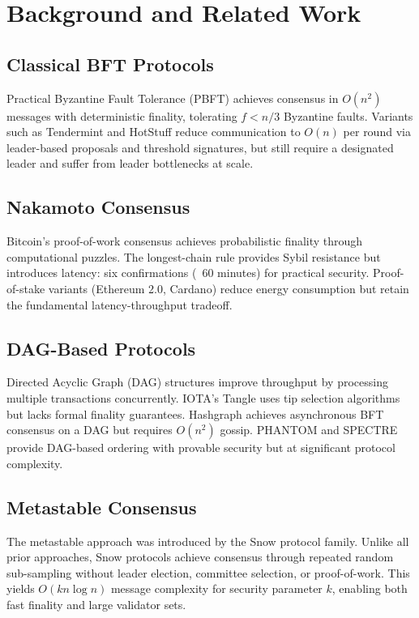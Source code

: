 \section{Background and Related Work}
\label{sec:background}

\subsection{Classical BFT Protocols}

Practical Byzantine Fault Tolerance (PBFT) \citep{castro1999practical} achieves consensus in $O(n^2)$ messages with deterministic finality, tolerating $f < n/3$ Byzantine faults. Variants such as Tendermint \citep{buchman2016tendermint} and HotStuff \citep{yin2019hotstuff} reduce communication to $O(n)$ per round via leader-based proposals and threshold signatures, but still require a designated leader and suffer from leader bottlenecks at scale.

\subsection{Nakamoto Consensus}

Bitcoin's proof-of-work consensus \citep{nakamoto2008bitcoin} achieves probabilistic finality through computational puzzles. The longest-chain rule provides Sybil resistance but introduces latency: six confirmations (~60 minutes) for practical security. Proof-of-stake variants (Ethereum 2.0, Cardano) reduce energy consumption but retain the fundamental latency-throughput tradeoff.

\subsection{DAG-Based Protocols}

Directed Acyclic Graph (DAG) structures improve throughput by processing multiple transactions concurrently. IOTA's Tangle uses tip selection algorithms but lacks formal finality guarantees. Hashgraph achieves asynchronous BFT consensus on a DAG but requires $O(n^2)$ gossip. PHANTOM and SPECTRE provide DAG-based ordering with provable security but at significant protocol complexity.

\subsection{Metastable Consensus}

The metastable approach was introduced by the Snow protocol family. Unlike all prior approaches, Snow protocols achieve consensus through repeated random sub-sampling without leader election, committee selection, or proof-of-work. This yields $O(kn \log n)$ message complexity for security parameter $k$, enabling both fast finality and large validator sets.

